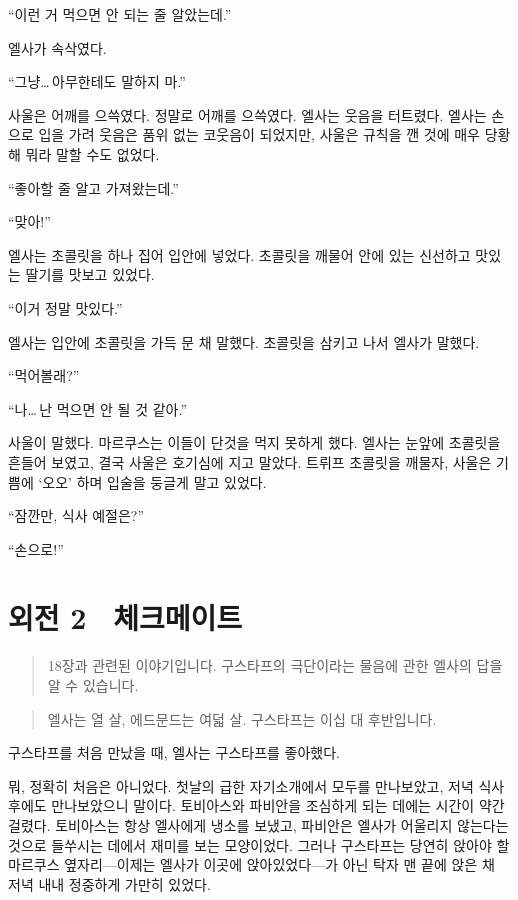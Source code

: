 ``이런 거 먹으면 안 되는 줄 알았는데.''

엘사가 속삭였다.

``그냥\ldots\,아무한테도 말하지 마.''

사울은 어깨를 으쓱였다. 정말로 어깨를 으쓱였다. 엘사는 웃음을 터트렸다. 엘사는 손으로 입을 가려 웃음은 품위 없는 코웃음이 되었지만, 사울은 규칙을 깬 것에 매우 당황해 뭐라 말할 수도 없었다.

``좋아할 줄 알고 가져왔는데.''

``맞아!''

엘사는 초콜릿을 하나 집어 입안에 넣었다. 초콜릿을 깨물어 안에 있는 신선하고 맛있는 딸기를 맛보고 있었다.

``이거 정말 맛있다.''

엘사는 입안에 초콜릿을 가득 문 채 말했다. 초콜릿을 삼키고 나서 엘사가 말했다.

``먹어볼래?''

``나\ldots\,난 먹으면 안 될 것 같아.''

사울이 말했다. 마르쿠스는 이들이 단것을 먹지 못하게 했다. 엘사는 눈앞에 초콜릿을 흔들어 보였고, 결국 사울은 호기심에 지고 말았다. 트뤼프 초콜릿을 깨물자, 사울은 기쁨에 `오오' 하며 입술을 둥글게 말고 있었다.

``잠깐만, 식사 예절은?''

``손으로!''



\chapter[외전2. 체크메이트][외전 2\hspace*{.5em}체크메이트]{외전 2 \ 체크메이트}



\begin{quote}

\small 18장과 관련된 이야기입니다. 구스타프의 극단이라는 물음에 관한 엘사의 답을 알 수 있습니다.

\end{quote}

\begin{quote}

\small 엘사는 열 살, 에드문드는 여덟 살. 구스타프는 이십 대 후반입니다.

\end{quote}구스타프를 처음 만났을 때, 엘사는 구스타프를 좋아했다.

뭐, 정확히 처음은 아니었다. 첫날의 급한 자기소개에서 모두를 만나보았고, 저녁 식사 후에도 만나보았으니 말이다. 토비아스와 파비안을 조심하게 되는 데에는 시간이 약간 걸렸다. 토비아스는 항상 엘사에게 냉소를 보냈고, 파비안은 엘사가 어울리지 않는다는 것으로 들쑤시는 데에서 재미를 보는 모양이었다. 그러나 구스타프는 당연히 앉아야 할 마르쿠스 옆자리—이제는 엘사가 이곳에 앉아있었다—가 아닌 탁자 맨 끝에 앉은 채 저녁 내내 정중하게 가만히 있었다.

